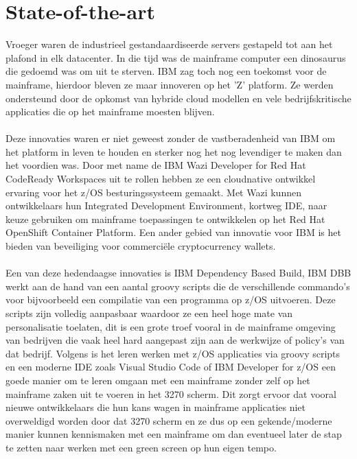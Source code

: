 
\section{State-of-the-art}%
\label{sec:state-of-the-art}

Vroeger waren de industrieel gestandaardiseerde servers gestapeld tot aan het plafond in elk datacenter. 
In die tijd was de mainframe computer een dinosaurus die gedoemd was om uit te sterven.  
IBM zag toch nog een toekomst voor de mainframe, hierdoor bleven ze maar innoveren op het 'Z' platform. 
Ze werden ondersteund door de opkomst van hybride cloud modellen en vele bedrijfskritische applicaties die op het mainframe moesten blijven. \autocite{Moorhead2022}
\\ \\
Deze innovaties waren er niet geweest zonder de vastberadenheid van IBM om het platform in leven te houden en sterker nog het nog levendiger te maken dan het voordien was. 
Door met name de IBM Wazi Developer for Red Hat CodeReady Workspaces uit te rollen hebben ze een cloudnative ontwikkel ervaring voor het z/OS besturingssysteem gemaakt. 
Met Wazi kunnen ontwikkelaars hun Integrated Development Environment, kortweg IDE, naar keuze gebruiken om mainframe toepassingen te ontwikkelen op het Red Hat OpenShift Container Platform. 
Een ander gebied van innovatie voor IBM is het bieden van beveiliging voor commerciële cryptocurrency wallets. \autocite{Bloomberg2021}
\\ \\
Een van deze hedendaagse innovaties is IBM Dependency Based Build, IBM DBB werkt aan de hand van een aantal groovy scripts die de verschillende commando's voor bijvoorbeeld een compilatie van een programma op z/OS uitvoeren.
Deze scripts zijn volledig aanpasbaar waardoor ze een heel hoge mate van personalisatie toelaten, dit is een grote troef vooral in de mainframe omgeving van bedrijven die vaak heel hard aangepast zijn aan de werkwijze of policy's van dat bedrijf.
Volgens \textcite{Porter2019} is het leren werken met z/OS applicaties via groovy scripts en een moderne IDE zoals Visual Studio Code of IBM Developer for z/OS een goede manier om te leren omgaan met een mainframe zonder zelf op het mainframe zaken uit te voeren in het 3270 scherm.
Dit zorgt ervoor dat vooral nieuwe ontwikkelaars die hun kans wagen in mainframe applicaties niet overweldigd worden door dat 3270 scherm en ze dus op een gekende/moderne manier kunnen kennismaken met een mainframe om dan eventueel later de stap te zetten naar werken met een green screen op hun eigen tempo. \autocite{Porter2019}
